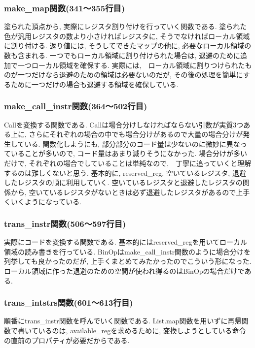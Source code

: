 \documentclass{jarticle}
\begin{document}
\subsubsection{make\_map関数(341〜355行目)}
塗られた頂点から, 実際にレジスタ割り付けを行っていく関数である. 塗られた色が汎用レジスタの数より小さければレジスタに, そうでなければローカル領域に割り付ける. 返り値には, そうしてできたマップの他に, 必要なローカル領域の数も含まれる. 一つでもローカル領域に割り付けられた場合は, 退避のために追加で一つローカル領域を確保する. 実際には,　ローカル領域に割りつけられたものが一つだけなら退避のための領域は必要ないのだが, その後の処理を簡単にするために一つだけの場合も退避する領域を確保している.
\subsubsection{make\_call\_instr関数(364〜502行目)}
Callを変換する関数である. Callは場合分けしなければならない引数が実質3つある上に, さらにそれぞれの場合の中でも場合分けがあるので大量の場合分けが発生している. 関数化しようにも, 部分部分のコード量は少ないのに微妙に異なっていることが多いので, コード量はあまり減りそうになかった. 場合分けが多いだけで, それぞれの場合でしていることは単純なので,　丁寧に追っていくと理解するのは難しくないと思う. 基本的に, reserved\_reg, 空いているレジスタ, 退避したレジスタの順に利用していく. 空いているレジスタと退避したレジスタの関係から, 空いているレジスタがないときは必ず退避したレジスタがあるので上手くいくようになっている.
\subsubsection{trans\_instr関数(506〜597行目)}
実際にコードを変換する関数である. 基本的にはreserved\_regを用いてローカル領域の読み書きを行っている. BinOpはmake\_call\_instr関数のように場合分けを列挙しても良かったのだが, 上手くまとめてみたかったのでこういう形になった. ローカル領域に作った退避のための空間が使われ得るのはBinOpの場合だけである. 
\subsubsection{trans\_intstrs関数(601〜613行目)}
順番にtrans\_instr関数を呼んでいく関数である. List.map関数を用いずに再帰関数で書いているのは, available\_regを求めるために, 変換しようとしている命令の直前のプロパティが必要だからである.
\end{document}

